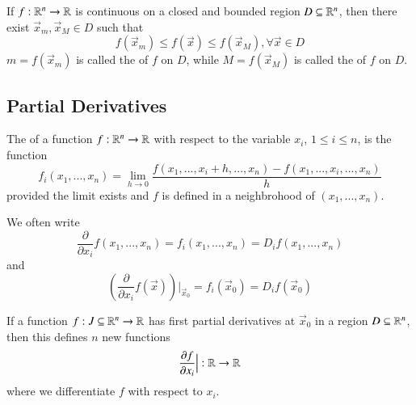 \begin{appendices}
    \begin{namthm}
        If $f:\mathbb R^n \rightarrow \mathbb R$ is continuous on a closed and bounded region $D \subseteq \mathbb R^n$, then there exist $\vec{x}_m,\vec{x}_M \in D$ such that \begin{equation}
            f(\vec{x}_m) \leq f(\vec{x}) \leq f(\vec{x}_M), \forall \vec{x} \in D
        \end{equation}
        $m = f(\vec{x}_m)$ is called the  of $f$ on $D$, while $M = f(\vec{x}_M)$ is called the  of $f$ on $D$.
    \end{namthm}
    

    \subsection{Partial Derivatives}

    \begin{defn}
        The  of a function $f:\mathbb R^n\rightarrow \mathbb R$ with respect to the variable $x_i$, $1 \leq i \leq n$, is the function \begin{equation}
            f_i(x_1,...,x_n) = \lim_{h\rightarrow 0}\frac{f(x_1,...,x_i+h,...,x_n) - f(x_1,...,x_i,...,x_n)}{h}
        \end{equation}
        provided the limit exists and $f$ is defined in a neighbrohood of $(x_1,...,x_n)$.
    \end{defn}

    \begin{nota}
        We often write \begin{equation}
            \frac{\partial}{\partial x_i}f(x_1,...,x_n) = f_i(x_1,...,x_n) = D_if(x_1,...,x_n)
        \end{equation}
        and \begin{equation}
            \left(\frac{\partial}{\partial x_i}f(\vec{x})\right)\Big\rvert_{\vec{x}_0} = f_i(\vec{x}_0) = D_if(\vec{x}_0)
        \end{equation}
    \end{nota}
    

    \begin{rmk}
        If a function $f:J\subseteq \mathbb R^n\rightarrow \mathbb R$ has first partial derivatives at $\vec{x}_0$ in a region $D \subseteq \mathbb R^n$, then this defines $n$ new functions \begin{equation}
            \frac{\partial f}{\partial x_i}\Big\rvert:\mathbb R\rightarrow \mathbb R
        \end{equation}
        where we differentiate $f$ with respect to $x_i$.
    \end{rmk}


\end{appendices}

